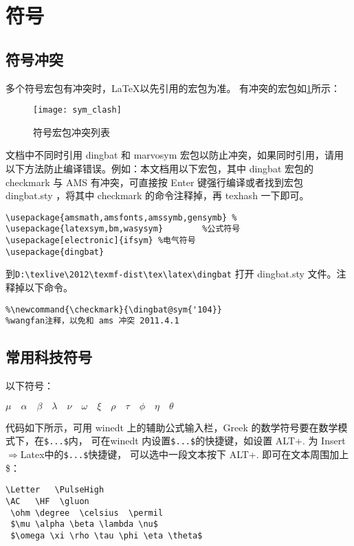 \section{符号}

\subsection{符号冲突}
多个符号宏包有冲突时，\LaTeX 以先引用的宏包为准。
有冲突的宏包如\ref{sym_clash}所示：

\begin{figure}[ht]
  \centering
  \texttt{[image: sym\_clash]}\\
   \caption{符号宏包冲突列表} \label{sym_clash}
\end{figure}


文档中不同时引用 dingbat 和 marvosym 宏包以防止冲突，如果同时引用，请用以下方法防止编译错误。例如：本文档用以下宏包，其中 dingbat 宏包的 checkmark 与 AMS 有冲突，可直接按 Enter 键强行编译或者找到宏包 dingbat.sty ，将其中 checkmark 的命令注释掉，再 texhash 一下即可。

\begin{shaded}
\begin{verbatim}
\usepackage{amsmath,amsfonts,amssymb,gensymb} %
\usepackage{latexsym,bm,wasysym}        %公式符号
\usepackage[electronic]{ifsym} %电气符号
\usepackage{dingbat}
\end{verbatim}
\end{shaded}
到\verb|D:\texlive\2012\texmf-dist\tex\latex\dingbat| 打开 dingbat.sty 文件。注释掉以下命令。
\begin{shaded}
\begin{verbatim}
%\newcommand{\checkmark}{\dingbat@sym{'104}}
%wangfan注释，以免和 ams 冲突 2011.4.1
\end{verbatim}
\end{shaded}

\subsection{常用科技符号}
以下符号：
\begin{framed}
\Letter \quad \PulseHigh \quad \quad
\AC \quad \HF \quad \gluon \quad
\ohm \quad\degree \quad \celsius \quad \permil \quad

 $\mu \quad \alpha \quad\beta\quad\lambda\quad\nu\quad\omega \quad\xi\quad\rho\quad\tau\quad\phi\quad\eta\quad\theta$
\end{framed}
代码如下所示，可用 winedt 上的辅助公式输入栏，Greek 的数学符号要在数学模式下，在\verb|$...$|内，
可在winedt 内设置\verb|$...$|的快捷键，如设置 ALT+. 为 Insert$\Rightarrow$Latex中的\verb|$...$|快捷键，
可以选中一段文本按下 ALT+. 即可在文本周围加上\$：
\begin{shaded}
\begin{verbatim}
\Letter   \PulseHigh
\AC   \HF  \gluon
 \ohm \degree  \celsius  \permil
 $\mu \alpha \beta \lambda \nu$
 $\omega \xi \rho \tau \phi \eta \theta$
\end{verbatim}
\end{shaded}

